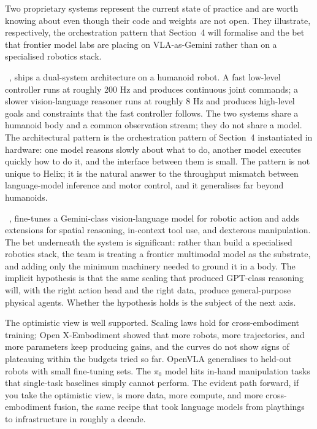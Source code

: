 \vspace{2.5em}

 Two proprietary systems represent the current state of practice and are worth knowing about even though their code and weights are not open. They illustrate, respectively, the orchestration pattern that Section~4 will formalise and the bet that frontier model labs are placing on VLA-as-Gemini rather than on a specialised robotics stack.

~\cite{FigureAI2025Helix}, ships a dual-system architecture on a humanoid robot. A fast low-level controller runs at roughly 200 Hz and produces continuous joint commands; a slower vision-language reasoner runs at roughly 8 Hz and produces high-level goals and constraints that the fast controller follows. The two systems share a humanoid body and a common observation stream; they do not share a model. The architectural pattern is the orchestration pattern of Section~4 instantiated in hardware: one model reasons slowly about what to do, another model executes quickly how to do it, and the interface between them is small. The pattern is not unique to Helix; it is the natural answer to the throughput mismatch between language-model inference and motor control, and it generalises far beyond humanoids.

~\cite{GeminiRobotics2025}, fine-tunes a Gemini-class vision-language model for robotic action and adds extensions for spatial reasoning, in-context tool use, and dexterous manipulation. The bet underneath the system is significant: rather than build a specialised robotics stack, the team is treating a frontier multimodal model as the substrate, and adding only the minimum machinery needed to ground it in a body. The implicit hypothesis is that the same scaling that produced GPT-class reasoning will, with the right action head and the right data, produce general-purpose physical agents. Whether the hypothesis holds is the subject of the next axis.

\vspace{2.5em}

 The optimistic view is well supported. Scaling laws hold for cross-embodiment training; Open X-Embodiment showed that more robots, more trajectories, and more parameters keep producing gains, and the curves do not show signs of plateauing within the budgets tried so far. OpenVLA generalises to held-out robots with small fine-tuning sets. The $\pi_0$ model hits in-hand manipulation tasks that single-task baselines simply cannot perform. The evident path forward, if you take the optimistic view, is more data, more compute, and more cross-embodiment fusion, the same recipe that took language models from playthings to infrastructure in roughly a decade.

